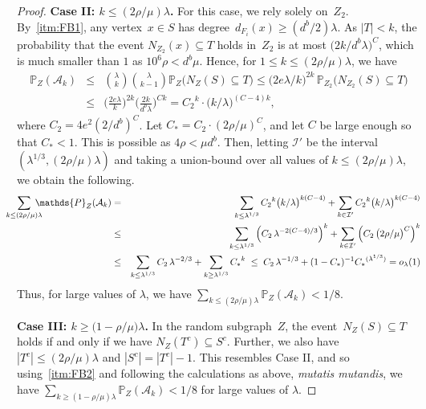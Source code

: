 \documentclass[10pt,a4paper]{amsart}
\begin{document}
\begin{proof}
    \noindent \textbf{Case II: $k \leq (2\rho/\mu) \lambda$.} For this case, we rely solely on~$Z_2$. By~\ref{itm:FB1}, any vertex~$x \in S$ has degree~$d_{F_i}(x) \geq (d^b/2)\lambda$. As $|T| < k$, the probability that the event $N_{Z_2}(x) \subseteq T$ holds in~$Z_2$ is at most $\bigl(2k/d^b\lambda\bigr)^C$, which is much smaller than $1$ as $10^6\rho < d^b \mu$. Hence, for $1 \leq k \leq (2\rho/\mu)\lambda$, we have 
    \begin{eqnarray*}
        \mathds{P}_{Z}(\mathcal{A}_k) &\leq& \binom{\lambda}{k}\binom{\lambda}{k-1} \mathds{P}_Z\bigl(N_Z(S) \subseteq T\bigr) \leq \bigl(2e\lambda/{k}\bigr)^{\!2k} \,\mathds{P}_{Z_2}\bigl(N_{Z_2}(S) \subseteq T\bigr) \\
        &\leq& \biggl(\frac{2e\lambda}{k}\biggr)^{\!2k} \biggl(\frac{2k}{d^b\lambda}\biggr)^{\!Ck} = {C_2}^k\cdot \bigl(k/\lambda\bigr)^{\!(C-4)k},
    \end{eqnarray*}
    where $C_2 = 4e^2 (2/d^b)^C$. Let $C_* = C_2\cdot (2\rho/\mu)^C$, and let $C$ be large enough so that $C_* < 1$. This is possible as $4\rho < \mu d^b$. Then, letting $\mathcal{I}'$ be the interval $(\lambda^{1/3}, (2\rho/\mu)\lambda)$ and taking a union-bound over all values of $k \leq (2\rho/\mu)\lambda$, we obtain the following. 
    \begin{eqnarray*}
        \smashoperator{\sum_{k \leq (2\rho/\mu)\lambda}}\; \mathds{P}_Z(\mathcal{A}_k) &=& \sum_{k \leq \lambda^{1/3}} {C_2}^k \bigl(k/\lambda\bigr)^{k(C-4)} + \sum_{k \in \mathcal{I}'} {C_2}^k \bigl( k/\lambda\bigr)^{k(C-4)}\\
        &\leq& \sum_{k \leq \lambda^{1/3}} {\Bigl(C_2\, \lambda^{-2(C-4)/3} \Bigr)}^k + \sum_{k \in \mathcal{I}'} {\Bigl(C_2\, \bigl(2\rho/\mu\bigr)^C \Bigr)}^k \\
        &\leq& \sum_{k \leq \lambda^{1/3}} C_2\, \lambda^{-2/3} + \sum_{k \geq \lambda^{1/3}} {C_*}^k\; \leq\;  C_2\, \lambda^{-1/3} + (1- C_*)^{-1}{C_*}^{(\lambda^{1/3})} =  o_\lambda(1)
    \end{eqnarray*}
    Thus, for large values of $\lambda$, we have $\sum_{k \leq (2\rho/\mu)\lambda} \mathds{P}_Z(\mathcal{A}_k) < 1/8$. 

    \textbf{Case III: $k \geq  \big(1 - \rho/\mu\big)\lambda$.} In the random subgraph~$Z$, the event~$N_Z(S) \subseteq T$ holds if and only if we have $N_Z(T^c) \subseteq S^c$. Further, we also have $|T^c| \leq (2\rho/\mu)\lambda$ and $|S^c| = |T^c| - 1$. This resembles Case II, and so using~\ref{itm:FB2} and following the calculations as above, \emph{mutatis mutandis}, we have $\sum_{k \geq (1 - \rho/\mu)\lambda} \mathds{P}_Z(\mathcal{A}_k) < 1/8$ for large values of $\lambda$. 


\end{proof}
\end{document}
